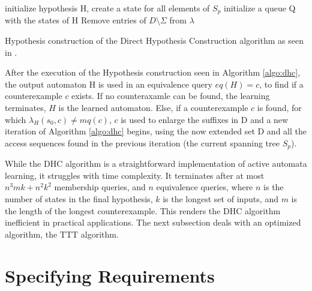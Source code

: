 \begin{algorithm}[H]
	\SetAlgoLined
	\DontPrintSemicolon
	initialize hypothesis H, create a state for all elements of $S_p$\;
	initialize a queue Q with the states of H\;
	Remove entries of $D\setminus\Sigma$ from $\lambda$\;
	\;
	\caption{Hypothesis construction of the Direct Hypothesis Construction algorithm as seen in \cite{Steffen2011}.}
	\label{algo:dhc}
\end{algorithm}

After the execution of the Hypothesis construction seen in Algorithm \ref{algo:dhc}, the output automaton H is used in an equivalence query $eq(H) = c$, to find if a counterexample $c$ exists. If no counteraxamle can be found, the learning terminates, $H$ is the learned automaton. Else, if a counterexample $c$ is found, for which $\lambda_H(s_0,c) \neq mq(c)$, $c$ is used to enlarge the suffixes in D and a new iteration of Algorithm \ref{algo:dhc} begins, using the now extended set D and all the access sequences found in the previous iteration (the current spanning tree $S_p$).

While the DHC algorithm is a straightforward implementation of active automata learning, it struggles with time complexity. It terminates after at most $n^3mk+n^2k^2$ membership queries, and $n$ equivalence queries, where $n$ is the number of states in the final hypothesis, $k$ is the longest set of inputs, and $m$ is the length of the longest counterexample. This renders the DHC algorithm inefficient in practical applications. The next subsection deals with an optimized algorithm, the TTT algorithm.

\section{Specifying Requirements} \label{sec_backgrspecreq}

